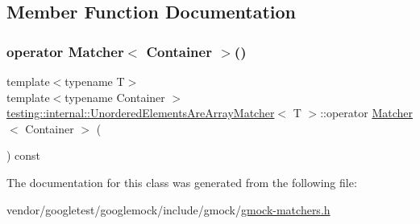 \subsection{Member Function Documentation}
\mbox{\label{classtesting_1_1internal_1_1_unordered_elements_are_array_matcher_ab09b91c39147c51f9c970fd155f2da77}} 
\subsubsection{\texorpdfstring{operator Matcher$<$ Container $>$()}{operator Matcher< Container >()}}
{\footnotesize\ttfamily template$<$typename T$>$ \\
template$<$typename Container $>$ \\
\hyperlink{classtesting_1_1internal_1_1_unordered_elements_are_array_matcher}{testing\+::internal\+::\+Unordered\+Elements\+Are\+Array\+Matcher}$<$ T $>$\+::operator \hyperlink{classtesting_1_1_matcher}{Matcher}$<$ Container $>$ (\begin{DoxyParamCaption}{ }\end{DoxyParamCaption}) const\hspace{0.3cm}{\ttfamily [inline]}}



The documentation for this class was generated from the following file\+:\begin{DoxyCompactItemize}
\item 
vendor/googletest/googlemock/include/gmock/\hyperlink{gmock-matchers_8h}{gmock-\/matchers.\+h}\end{DoxyCompactItemize}
